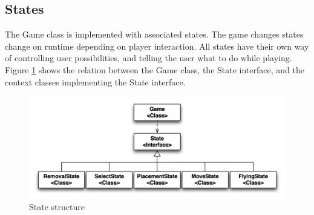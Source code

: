 \pagebreak
\subsection{States}

The Game class is implemented with associated states. The game changes states change on runtime depending on player interaction. All states have their own way of controlling user possibilities, and telling the user what to do while playing. Figure \ref{fig:states} shows the relation between the Game class, the State interface, and the context classes implementing the State interface.

\begin{figure}[H]
\begin{center}
\includegraphics[width=\textwidth]{Images/states}
\caption{State structure}
\label{fig:states}
\end{center}
\end{figure}

